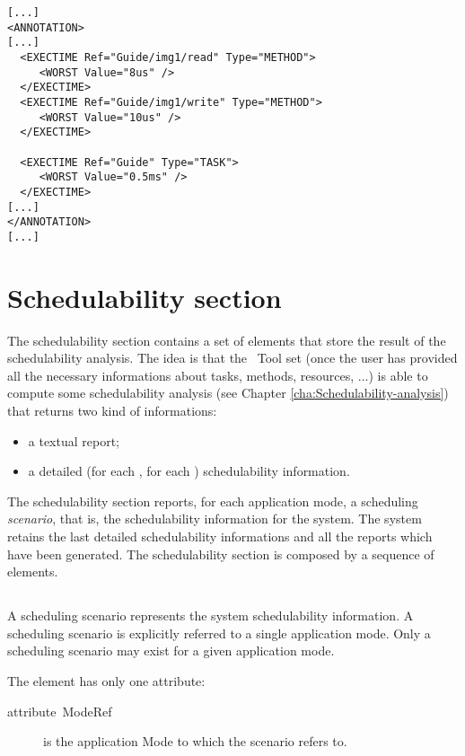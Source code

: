 \begin{lstlisting}
[...]
<ANNOTATION>
[...]
  <EXECTIME Ref="Guide/img1/read" Type="METHOD">
     <WORST Value="8us" />
  </EXECTIME>
  <EXECTIME Ref="Guide/img1/write" Type="METHOD">
     <WORST Value="10us" />
  </EXECTIME> 

  <EXECTIME Ref="Guide" Type="TASK">
     <WORST Value="0.5ms" />
  </EXECTIME> 
[...]
</ANNOTATION>
[...]
\end{lstlisting}


\section{Schedulability section}
\label{sec:Schedulability-section}

The schedulability section contains a set of elements that store the
result of the schedulability analysis. The idea is that the \rtd\ Tool
set (once the user has provided all the necessary informations about
tasks, methods, resources, ...) is able to compute some
schedulability analysis (see Chapter
\ref{cha:Schedulability-analysis}) that returns two kind of
informations:

\begin{itemize}
\item a textual report;
\item a detailed (for each , for each ) schedulability
information.
\end{itemize}

The schedulability section reports, for each application mode, a
scheduling \emph{scenario}, that is, the schedulability information
for the system.  The system retains the last detailed schedulability
informations and all the reports which have been generated. The
schedulability section is composed by a sequence of
 elements.


\subsection{}

A scheduling scenario represents the system schedulability
information.  A scheduling scenario is explicitly referred to a single
application mode. Only a scheduling scenario may exist for a given
application mode.

The  element has only one attribute:

\begin{description}
\item [{attribute~ModeRef}] is the application Mode to which the
  scenario refers to.
\end{description}

